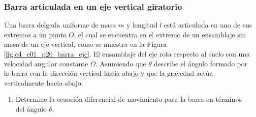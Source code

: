 \subsubsection{Barra articulada en un eje vertical giratorio}

Una barra delgada uniforme de masa $m$ y longitud $l$ está articulada en uno de sus extremos a un punto $O$, el cual se encuentra en el extremo de un ensamblaje sin masa de un eje vertical, como se muestra en la Figura \ref{fig:c4_e01_p20_barra_eje}. El ensamblaje del eje rota respecto al suelo con una velocidad angular constante $\Omega$. Asumiendo que $\theta$ describe el ángulo formado por la barra con la dirección vertical hacia abajo y que la gravedad actúa verticalmente hacia abajo:

\begin{enumerate}
    \item Determine la ecuación diferencial de movimiento para la barra en términos del ángulo $\theta$.
\end{enumerate}

